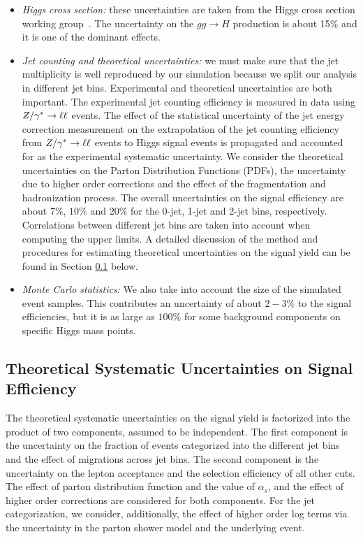 \begin{itemize}
\item {\it Higgs cross section:} these uncertainties are taken from the Higgs cross
section working group~\cite{LHCHiggsCrossSectionWorkingGroup:2011ti}. The uncertainty 
on the $gg \to H$ production is about 15\% and it is one of the dominant effects.

\item {\it Jet counting and theoretical uncertainties:} 
we must make sure that the jet multiplicity is well reproduced by our 
simulation because we split our analysis in different jet bins. 
Experimental and theoretical uncertainties are both important.
The experimental jet counting efficiency is measured in data 
using $Z/\gamma^*\to\ell\ell$ events. The effect of the statistical uncertainty 
of the jet energy correction measurement on the extrapolation
of the jet counting efficiency from $Z/\gamma^*\to\ell\ell$ events to Higgs signal
events is propagated and accounted for as the experimental 
systematic uncertainty.
We consider the theoretical uncertainties on the Parton Distribution Functions (PDFs), 
the uncertainty due to higher order corrections and the effect of the fragmentation and 
hadronization process. The overall uncertainties on the signal efficiency are 
about $7\%$, $10\%$ and $20\%$ for the 0-jet, 1-jet and 2-jet bins, respectively.
Correlations between different jet bins are taken into account when computing
the upper limits. A detailed discussion of the method and procedures for estimating
theoretical uncertainties on the signal yield can be found in 
Section \ref{sec:theorySystematicsSignal} below.

\item {\it Monte Carlo statistics:} We also take into account the 
size of the simulated event samples. 
This contributes an uncertainty of about $2-3\%$ to the signal
efficiencies, but it is as large as $100\%$ for some background components on specific
Higgs mass points.
\end{itemize}

\subsection{Theoretical Systematic Uncertainties on Signal Efficiency}
\label{sec:theorySystematicsSignal}
The theoretical systematic uncertainties on the signal yield is factorized into the
product of two components, assumed to be independent. The first component is the uncertainty
on the fraction of events categorized into the different jet bins and the effect
of migrations across jet bins. The second component is the uncertainty
on the lepton acceptance and the selection efficiency of all other cuts. The effect of
parton distribution function and the value of $\alpha_{s}$, and the effect of 
higher order corrections are considered for both components. For the jet categorization,
we consider, additionally, the effect of higher order log terms via the uncertainty in the 
parton shower model and the underlying event.

